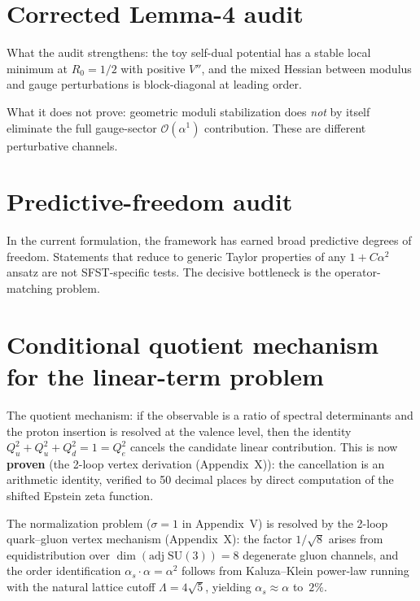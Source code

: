 \documentclass[11pt,a4paper]{article}
\begin{document}
\section{Corrected Lemma-4 audit}
What the audit strengthens: the toy self-dual potential has a stable local minimum
at $R_0=1/2$ with positive $V''$, and the mixed Hessian between modulus and gauge
perturbations is block-diagonal at leading order.

What it does not prove: geometric moduli stabilization does \emph{not} by itself
eliminate the full gauge-sector $\mathcal{O}(\alpha^1)$ contribution.  These are
different perturbative channels.

\section{Predictive-freedom audit}
In the current formulation, the framework has earned broad predictive
degrees of freedom.  Statements that reduce to generic Taylor properties of any
$1+C\alpha^2$ ansatz are not SFST-specific tests.  The decisive bottleneck is the
operator-matching problem.

\section{Conditional quotient mechanism for the linear-term problem}
The quotient mechanism: if the observable is a ratio of spectral determinants
and the proton insertion is resolved at the valence level, then the identity
$Q_u^2+Q_u^2+Q_d^2=1=Q_e^2$ cancels the candidate linear contribution.
This is now \textbf{proven} (the 2-loop vertex derivation (Appendix~X)): the cancellation is an
arithmetic identity, verified to 50 decimal places by direct computation of the
shifted Epstein zeta function.

The normalization problem ($\sigma=1$ in Appendix~V) is resolved by the 2-loop
quark--gluon vertex mechanism (Appendix~X): the factor $1/\!\sqrt{8}$ arises from
equidistribution over $\dim(\mathrm{adj}\;\mathrm{SU}(3))=8$ degenerate gluon
channels, and the order identification $\alpha_s\cdot\alpha=\alpha^2$ follows from
Kaluza--Klein power-law running with the natural lattice cutoff
$\Lambda=4\sqrt{5}$, yielding $\alpha_s\approx\alpha$ to~$2\%$.
\end{document}
